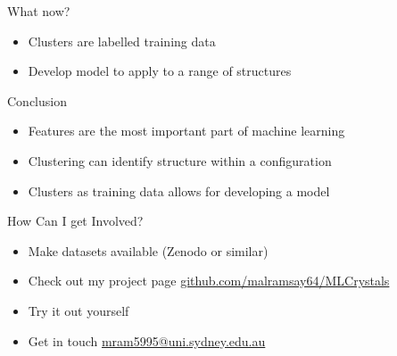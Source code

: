 \documentclass[aspectratio=169, 14pt]{beamer}
\begin{document}
\begin{frame}{What now?}

  \begin{itemize}
    \item Clusters are labelled training data
    \item Develop model to apply to a range of structures
  \end{itemize}

\end{frame}


\begin{frame}{Conclusion}

  \begin{itemize}
    \item Features are the most important part of machine learning
    \item Clustering can identify structure within a configuration
    \item Clusters as training data allows for developing a model
  \end{itemize}

\end{frame}


\begin{frame}{How Can I get Involved?}

  \begin{itemize}
    \item Make datasets available (Zenodo or similar)
    \item Check out my project page \url{github.com/malramsay64/MLCrystals}
    \item Try it out yourself
    \item Get in touch \href{mailto:mram5995@uni.sydney.edu.au}{mram5995@uni.sydney.edu.au}
  \end{itemize}

\end{frame}
\end{document}
